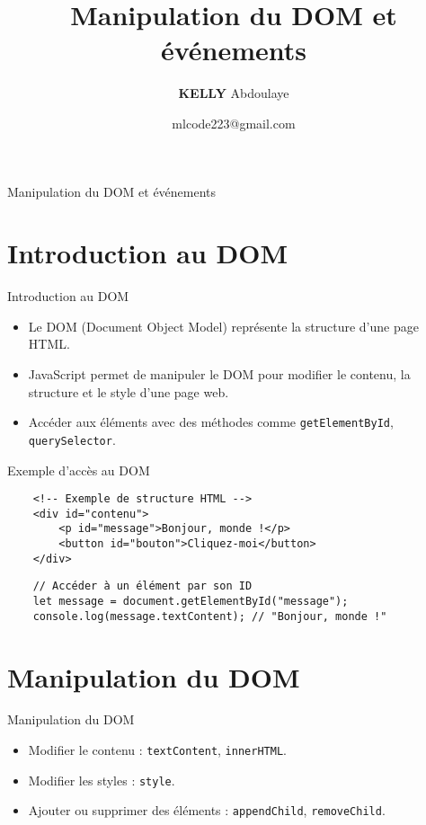 \documentclass{beamer}
\title{Manipulation du DOM et événements}
\author{\textbf{KELLY}  Abdoulaye}
\institute{\textit{Mali\_Code}}
\date{mlcode223@gmail.com}
\begin{document}
\begin{frame}
    \titlepage
    \end{frame}
    
    \begin{frame}{Manipulation du DOM et événements}
    \tableofcontents
    \end{frame}
    
    \section{Introduction au DOM}
    \begin{frame}{Introduction au DOM}
    \begin{itemize}
        \item Le DOM (Document Object Model) représente la structure d'une page HTML.
        \item JavaScript permet de manipuler le DOM pour modifier le contenu, la structure et le style d'une page web.
        \item Accéder aux éléments avec des méthodes comme \texttt{getElementById}, \texttt{querySelector}.
    \end{itemize}
    \end{frame}
    
    \begin{frame}[fragile]{Exemple d'accès au DOM}
    \begin{verbatim}
    <!-- Exemple de structure HTML -->
    <div id="contenu">
        <p id="message">Bonjour, monde !</p>
        <button id="bouton">Cliquez-moi</button>
    </div>
    \end{verbatim}
    
    \begin{verbatim}
    // Accéder à un élément par son ID
    let message = document.getElementById("message");
    console.log(message.textContent); // "Bonjour, monde !"
    \end{verbatim}
    \end{frame}
    
    \section{Manipulation du DOM}
    \begin{frame}{Manipulation du DOM}
    \begin{itemize}
        \item Modifier le contenu : \texttt{textContent}, \texttt{innerHTML}.
        \item Modifier les styles : \texttt{style}.
        \item Ajouter ou supprimer des éléments : \texttt{appendChild}, \texttt{removeChild}.
    \end{itemize}
    \end{frame}
    
\end{document}
